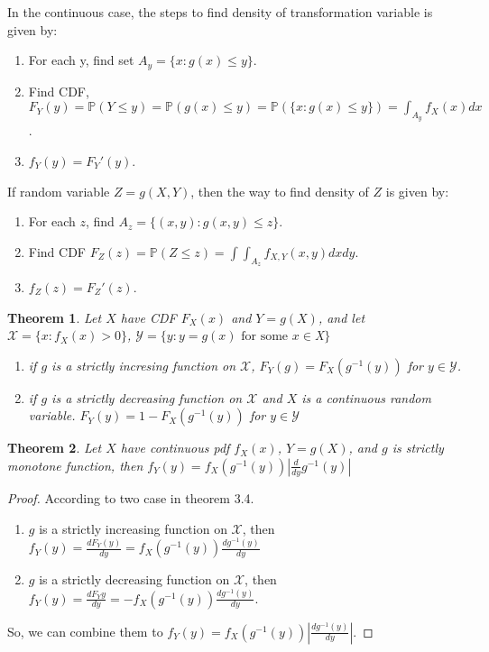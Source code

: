 \documentclass[11pt]{article}
\def\BP{{\bf P}}
\def\BP{{\mathbb P}}
\newtheorem{theorem}{Theorem}[section]
\begin{document}
In the continuous case, the steps to find density of transformation variable is given by:
\begin{enumerate}
\item For each y, find set $A_y = \{x:g(x) \leq y\}$.
\item Find CDF, $F_Y(y) = \BP(Y \leq y) = \BP(g(x) \leq y) = \BP(\{x: g(x)\leq y\}) = \int_{A_y} f_X(x) dx$.
\item $f_Y(y) = F_Y'(y)$.
\end{enumerate}

If random variable $Z = g(X, Y)$, then the way to find density of $Z$ is given by:
\begin{enumerate}
\item For each $z$, find $A_z = \{(x, y): g(x, y)\leq z\}$.
\item Find CDF $F_Z(z) = \BP(Z \leq z) = \int\int_{A_z} f_{X,Y}(x, y) dxdy$.
\item $f_Z(z) = F_Z'(z)$.
\end{enumerate}

\begin{theorem}
Let $X$ have CDF $F_X(x)$ and $Y=g(X)$, and let $\mathcal{X} = \{x : f_X(x) > 0\}$, $\mathcal{Y} = \{y: y = g(x) \text{ for some }x \in $X$\}$
\begin{enumerate}
\item if $g$ is a strictly incresing function on $\mathcal{X}$, $F_Y(g) = F_X(g^{-1}(y))$ for $y \in \mathcal{Y}$.
\item if $g$ is a strictly decreasing function on $\mathcal{X}$ and $X$ is a continuous  random variable. $F_Y(y) = 1 - F_X(g^{-1}(y))$ for $y\in\mathcal{Y}$
\end{enumerate}
\end{theorem}

\begin{theorem}
Let $X$ have continuous pdf $f_X(x)$, $Y=g(X)$, and $g$ is strictly monotone function, then $f_Y(y) = f_X(g^{-1}(y)) |\frac{d}{dy}g^{-1}(y)| $ 
\end{theorem}

\begin{proof}
According to two case in theorem 3.4. 
\begin{enumerate}
\item $g$ is a strictly increasing function on $\mathcal{X}$, then 
$f_Y(y) = \frac{dF_Y(y)}{dy} = f_X(g^{-1}(y)) \frac{dg^{-1}(y)}{dy}$
\item $g$ is a strictly decreasing function on $\mathcal{X}$, then 
$f_Y(y) = \frac{dF_Y{y}}{dy} =-f_X(g^{-1}(y))\frac{dg^{-1}(y)}{dy}$.
\end{enumerate}
So, we can combine them to $f_Y(y) = f_X(g^{-1}(y)) |\frac{dg^{-1}(y)}{dy}|$.
\end{proof}
\end{document}
